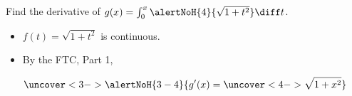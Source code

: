\begin{frame}
\begin{example} %
Find the derivative of $g(x) = \int_0^x \alertNoH{ 4}{\sqrt{1+t^2}}\diff t$.
\begin{itemize}
\item<2->  $f(t) = \sqrt{1+t^2}$ is continuous.
\item<3->  By the FTC, Part 1,
\end{itemize}
\[
\uncover<3->{%
\alertNoH{ 3-4}{g'(x) = \uncover<4->{\sqrt{1+x^2}}}%
}%
\]
\end{example}
\end{frame}
